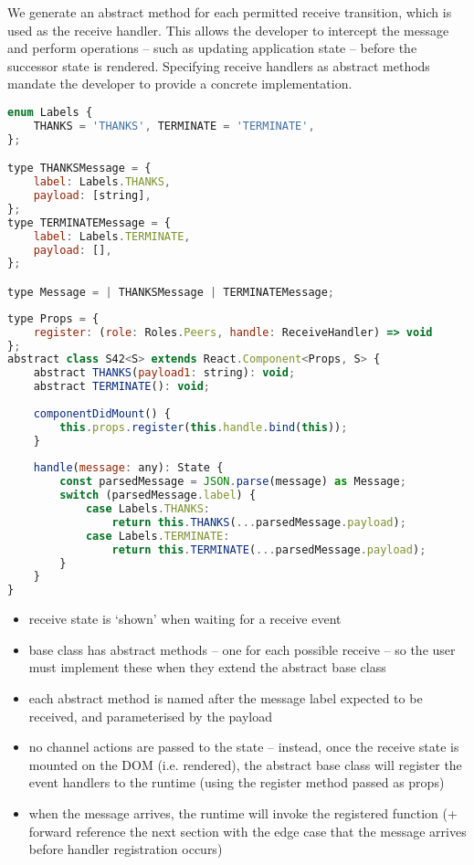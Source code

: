 We generate an abstract method for each permitted receive
transition, which is used as the receive handler.
This allows the developer to intercept the
message and perform operations -- such as updating
application state -- before the successor state is rendered.
Specifying receive handlers as abstract methods mandate
the developer to provide a concrete implementation.

\begin{lstlisting}[language=javascript,tabsize=2]
enum Labels {
	THANKS = 'THANKS', TERMINATE = 'TERMINATE',
};

type THANKSMessage = {
    label: Labels.THANKS,
    payload: [string],
};
type TERMINATEMessage = {
    label: Labels.TERMINATE,
    payload: [],
};

type Message = | THANKSMessage | TERMINATEMessage;
\end{lstlisting}

\begin{lstlisting}[language=javascript,tabsize=2]
type Props = {
	register: (role: Roles.Peers, handle: ReceiveHandler) => void
};
abstract class S42<S> extends React.Component<Props, S> {
	abstract THANKS(payload1: string): void;
	abstract TERMINATE(): void;
	
	componentDidMount() {
		this.props.register(this.handle.bind(this));	
	}
	
	handle(message: any): State {
		const parsedMessage = JSON.parse(message) as Message;
		switch (parsedMessage.label) {
			case Labels.THANKS:
				return this.THANKS(...parsedMessage.payload);			
			case Labels.TERMINATE:
				return this.TERMINATE(...parsedMessage.payload);
		}
	}
}
\end{lstlisting}


\begin{itemize}
\item receive state is `shown' when waiting for a receive event
\item base class has abstract methods -- one for each possible receive -- so the user must implement these when they extend the abstract base class
\item each abstract method is named after the message label expected to be received, and parameterised by the payload
\item no channel actions are passed to the state -- instead, once the receive state is mounted on the DOM (i.e. rendered), the abstract base class will register the event handlers to the runtime (using the register method passed as props)
\item when the message arrives, the runtime will invoke the registered function (+ forward reference the next section with the edge case that the message arrives before handler registration occurs)
\end{itemize}

